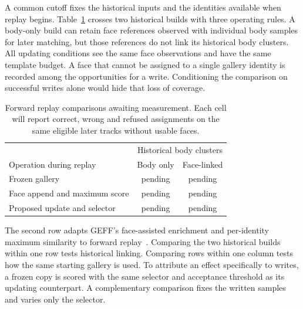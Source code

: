 \documentclass[journal,letterpaper]{IEEEtran}
\newcommand{\draftnote}[3]{\par\smallskip\noindent{\footnotesize
  \textcolor{editink}{\sffamily\bfseries [#2 #1]}\enspace
  \textcolor{editink}{#3}\par}\smallskip}
\newcommand{\expgap}[2]{\draftnote{EXPERIMENT}{#1}{#2}}
\begin{document}
A common cutoff fixes the historical inputs and the identities available when replay begins. Table~\ref{tab:replay} crosses two historical builds with three operating rules. A body-only build can retain face references observed with individual body samples for later matching, but those references do not link its historical body clusters. All updating conditions see the same face observations and have the same template budget. A face that cannot be assigned to a single gallery identity is recorded among the opportunities for a write. Conditioning the comparison on successful writes alone would hide that loss of coverage.

\begin{table}[t]
\caption{Forward replay comparisons awaiting measurement. Each cell will report correct, wrong and refused assignments on the same eligible later tracks without usable faces.}
\label{tab:replay}
\centering
\setlength{\tabcolsep}{4pt}
\begin{tabular}{@{}lcc@{}}
\toprule
 & \multicolumn{2}{c}{Historical body clusters}\\
\cmidrule(lr){2-3}
Operation during replay & Body only & Face-linked\\
\midrule
Frozen gallery & pending & pending\\
Face append and maximum score & pending & pending\\
Proposed update and selector & pending & pending\\
\bottomrule
\end{tabular}
\end{table}

The second row adapts GEFF's face-assisted enrichment and per-identity maximum similarity to forward replay~\cite{geff}. Comparing the two historical builds within one row tests historical linking. Comparing rows within one column tests how the same starting gallery is used. To attribute an effect specifically to writes, a frozen copy is scored with the same selector and acceptance threshold as its updating counterpart. A complementary comparison fixes the written samples and varies only the selector.
\expgap{E2}{Evaluate identical later faceless tracks across historical-gallery and update conditions, matching face evidence and capacity, and report paired recoveries, losses, misidentifications, and refusals.}
\end{document}
